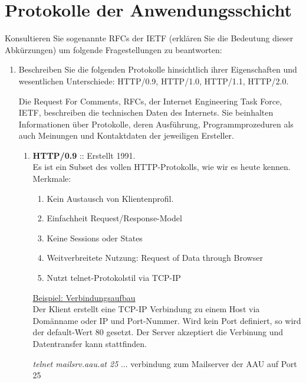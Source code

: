 \documentclass[11pt]{article}
\begin{document}
    \section{Protokolle der Anwendungsschicht}
    Konsultieren Sie sogenannte RFCs der IETF (erklären Sie die Bedeutung dieser
    Abkürzungen) um folgende Fragestellungen zu beantworten:

    \begin{enumerate}[\thesection .1]
    \item Beschreiben Sie die folgenden Protokolle hinsichtlich ihrer Eigenschaften und
wesentlichen Unterschiede: HTTP/0.9, HTTP/1.0, HTTP/1.1, HTTP/2.0.

    Die Request For Comments, RFCs, der Internet Engineering Task Force, IETF, beschreiben die technischen Daten des Internets.
    Sie beinhalten Informationen über Protokolle, deren Ausführung, Programmprozeduren als auch Meinungen und Kontaktdaten der
    jeweiligen Ersteller.

    \begin{enumerate}[$\diamond$]
        \item \textbf{HTTP/0.9} :: Erstellt 1991.\\ Es ist ein Subset des vollen HTTP-Protokolls, wie wir es heute kennen.\\
        Merkmale:
        \begin{addmargin}[1em]{1em}
            \begin{enumerate}
                \item Kein Austausch von Klientenprofil.
                \item Einfachheit Request/Response-Model
                \item Keine Sessions oder States
                \item Weitverbreitete Nutzung: Request of Data through Browser
                \item Nutzt telnet-Protokolstil via TCP-IP\\
            \end{enumerate}
        \end{addmargin}

        \underline{Beispiel: Verbindungsaufbau}\\
        Der Klient erstellt eine TCP-IP Verbindung zu einem Host via Domänname oder IP und Port-Nummer.
        Wird kein Port definiert, so wird der default-Wert 80 gesetzt.
        Der Server akzeptiert die Verbinung und Datentransfer kann stattfinden.
    \begin{addmargin}[1em]{1em}
        \emph{telnet mailsrv.aau.at 25} ... verbindung zum Mailserver der AAU auf Port 25\\
    \end{addmargin}


\end{enumerate}
\end{enumerate}
\end{document}
